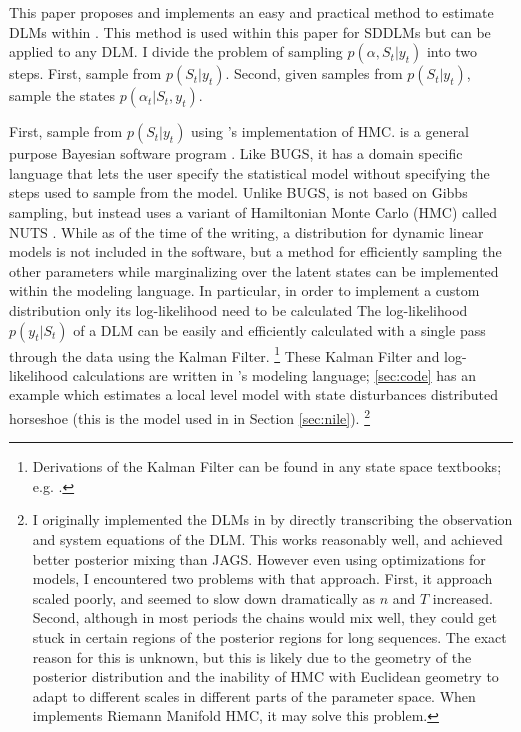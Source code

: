 \documentclass{article}
\begin{document}
This paper proposes and implements an easy and practical method to estimate DLMs within \Stan{} \parencite{Stan2013}.
This method is used within this paper for SDDLMs but can be applied to any DLM.
I divide the problem of sampling $p(\alpha, S_{t} | y_{t})$ into two steps.
First, sample from $p(S_{t} | y_{t})$. 
Second, given samples from $p(S_{t} | y_{t})$, sample the states $p(\alpha_{t} | S_{t}, y_{t})$.

First, sample from $p(S_{t} | y_{t})$ using \Stan{}'s implementation of HMC.
\Stan{} is a general purpose Bayesian software program \parencite{Stan2013b}.
Like BUGS, it has a domain specific language that lets the user specify the statistical model without specifying the steps used to sample from the model.
Unlike BUGS, \Stan{} is not based on Gibbs sampling, but instead uses a variant of Hamiltonian Monte Carlo (HMC) called NUTS \parencite{HoffmanGelman2013}.
While as of the time of the writing, a distribution for dynamic linear models is not included in the software, but a method for efficiently sampling the other parameters while marginalizing over the latent states can be implemented within the \Stan{} modeling language.
In particular, in order to implement a custom distribution only its log-likelihood need to be calculated \parencite[Chapter 17]{Stan2013}
The log-likelihood $p(y_{t} | S_{t})$ of a DLM can be easily and efficiently calculated with a single pass through the data using the Kalman Filter.%
\footnote{Derivations of the Kalman Filter can be found in any state space textbooks; e.g. \textcite{DurbinKoopman2001}.}
These Kalman Filter and log-likelihood calculations are written in \Stan{}'s modeling language;
\ref{sec:code} has an example which estimates a local level model with state disturbances distributed horseshoe (this is the model used in  in Section \ref{sec:nile}).
\footnote{
  I originally implemented the DLMs in \Stan{} by directly transcribing the observation and system equations of the DLM.
  This works reasonably well, and \Stan{} achieved better posterior mixing than JAGS.
  However even using optimizations for \Stan{} models, I encountered two problems with that approach.
  First, it approach scaled poorly, and seemed to slow down dramatically as $n$ and $T$ increased.
  Second, although in most periods the chains would mix well, they could get stuck in certain regions of the posterior regions for long sequences.
  The exact reason for this is unknown, but this is likely due to the geometry of the posterior distribution and the inability of HMC with Euclidean geometry to adapt to different scales in different parts of the parameter space.
  When \Stan{} implements Riemann Manifold HMC, it may solve this problem.
}
\end{document}
